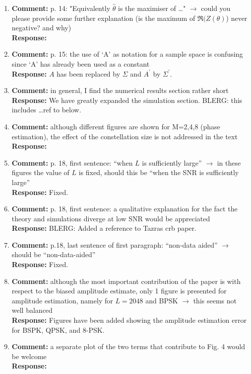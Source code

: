 \documentclass{article}
\begin{document}
\begin{enumerate}
\item \textbf{Comment:} p. 14: "Equivalently $\hat\theta$ is the maximiser of \dots" $\to$ could you please provide some further explanation (is the maximum of $\Re(Z(\theta)$) never negative? and why) \\
\textbf{Response:}

\item \textbf{Comment:} p. 15: the use of `A' as notation for a sample space is confusing since `A' has already been used as a constant \\
\textbf{Response:} $A$ has been replaced by $\Sigma$ and $A^\prime$ by $\Sigma^\prime$.


\item \textbf{Comment:} in general, I find the numerical results section rather short \\
\textbf{Response:} We have greatly expanded the simulation section. BLERG: this includes \dots ref to below.

\item \textbf{Comment:} although different figures are shown for M=2,4,8 (phase estimation), the effect of the constellation size is not addressed in the text  \\
\textbf{Response:}

\item \textbf{Comment:} p. 18, first sentence: ``when $L$ is sufficiently large'' $\to$ in these figures the value of $L$ is fixed, should this be ``when the SNR is sufficiently large''  \\
\textbf{Response:} Fixed.

\item \textbf{Comment:} p. 18, first sentence: a qualitative explanation for the fact the theory and simulations diverge at low SNR would be appreciated  \\
\textbf{Response:} BLERG: Added a reference to Tazras crb paper.

\item \textbf{Comment:} p.18, last sentence of first paragraph: ``non-data aided'' $\to$ should be ``non-data-aided''  \\
\textbf{Response:} Fixed.

\item \textbf{Comment:}  although the most important contribution of the paper is with respect to the biased amplitude estimate, only 1 figure is presented for amplitude estimation, namely for $L=2048$ and BPSK $\to$ this seems not well balanced  \\
\textbf{Response:} Figures have been added showing the amplitude estimation error for BSPK, QPSK, and 8-PSK. 

\item \textbf{Comment:}  a separate plot of the two terms that contribute to Fig. 4 would be welcome \\
\textbf{Response:}

\end{enumerate}
\end{document}
